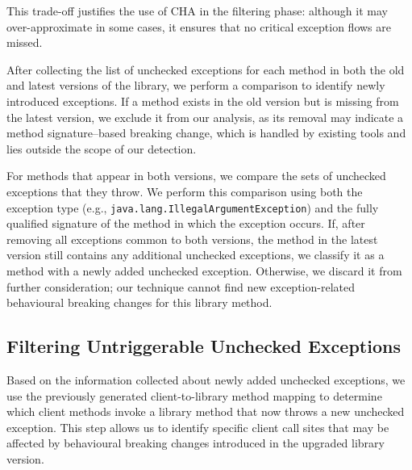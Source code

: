 
This trade-off justifies the use of CHA in the filtering phase: although it may over-approximate in some cases, it ensures that no critical exception flows are missed.

After collecting the list of unchecked exceptions for each method in both the old and latest versions of the library, we perform a comparison to identify newly introduced exceptions. If a method exists in the old version but is missing from the latest version, we exclude it from our analysis, as its removal may indicate a method signature–based breaking change, which is handled by existing tools and lies outside the scope of our detection.

For methods that appear in both versions, we compare the sets of unchecked exceptions that they throw. We perform this comparison using both the exception type (e.g., \texttt{java.lang.IllegalArgumentException}) and the fully qualified signature of the method in which the exception occurs. If, after removing all exceptions common to both versions, the method in the latest version still contains any additional unchecked exceptions, we classify it as a method with a newly added unchecked exception. Otherwise, we discard it from further consideration; our technique cannot find new exception-related behavioural breaking changes for this library method.

\subsection{Filtering Untriggerable Unchecked Exceptions}

Based on the information collected about newly added unchecked exceptions, we use the previously generated client-to-library method mapping to determine which client methods invoke a library method that now throws a new unchecked exception. This step allows us to identify specific client call sites that may be affected by behavioural breaking changes introduced in the upgraded library version.

